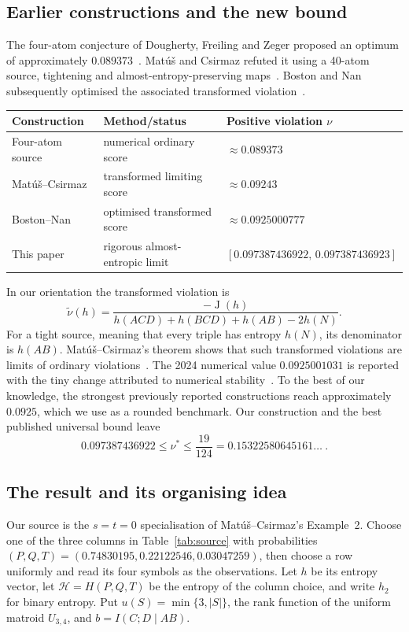 \documentclass[a4paper,11pt]{article}
\newcommand{\Ing}{\operatorname{J}}
\newcommand{\hb}{h_2}
\begin{document}
\subsection{Earlier constructions and the new bound}
The four-atom conjecture of Dougherty, Freiling and Zeger proposed an
optimum of approximately $0.089373$~\cite{DFZ}. Mat\'u\v{s} and Csirmaz
refuted it using a 40-atom source, tightening and almost-entropy-preserving
maps~\cite[Example~2, Theorem~4]{MC}. Boston and Nan subsequently
optimised the associated transformed violation~\cite{BN}.
\begin{center}
\small
\begin{tabular}{@{}lll@{}}
\toprule
Construction & Method/status & Positive violation $\nu$\\
\midrule
Four-atom source~\cite{DFZ} & numerical ordinary score & $\approx0.089373$\\
Mat\'u\v{s}--Csirmaz~\cite{MC} & transformed limiting score & $\approx0.09243$\\
Boston--Nan~\cite{BN} & optimised transformed score & $\approx0.0925000777$\\
This paper & rigorous almost-entropic limit & $[0.097387436922,\,0.097387436923]$\\
\bottomrule
\end{tabular}
\end{center}
In our orientation the transformed violation is
\[
 \widetilde\nu(h)=\frac{-\Ing(h)}{h(ACD)+h(BCD)+h(AB)-2h(N)}.
\]
For a tight source, meaning that every triple has entropy $h(N)$, its
denominator is $h(AB)$. Mat\'u\v{s}--Csirmaz's theorem shows that such
transformed violations are limits of ordinary violations~\cite[Theorem~2.6]{BN}.
The 2024 numerical value $0.0925001031$ is reported with the tiny change
attributed to numerical stability~\cite[Section~5.2, Table~2]{CNN}.
To the best of our knowledge, the strongest previously reported
constructions reach approximately $0.0925$, which we use as a rounded
benchmark. Our construction and the best published universal bound leave
\begin{equation}\label{eq:gap}
 0.097387436922\le\nu^*\le\frac{19}{124}
 =0.15322580645161\ldots\ .
\end{equation}

\subsection{The result and its organising idea}
Our source is the $s=t=0$ specialisation of Mat\'u\v{s}--Csirmaz's
Example~2. Choose one of the three columns in Table~\ref{tab:source}
with probabilities
$(P,Q,T)=(0.74830195,0.22122546,0.03047259)$, then choose a row uniformly
and read its four symbols as the observations. Let $h$ be its entropy
vector, let $\mathcal H=H(P,Q,T)$ be the entropy of the column choice,
and write $\hb$ for binary entropy. Put
$u(S)=\min\{3,|S|\}$, the rank function of the uniform matroid $U_{3,4}$,
and $b=I(C;D\mid AB)$.
\end{document}
